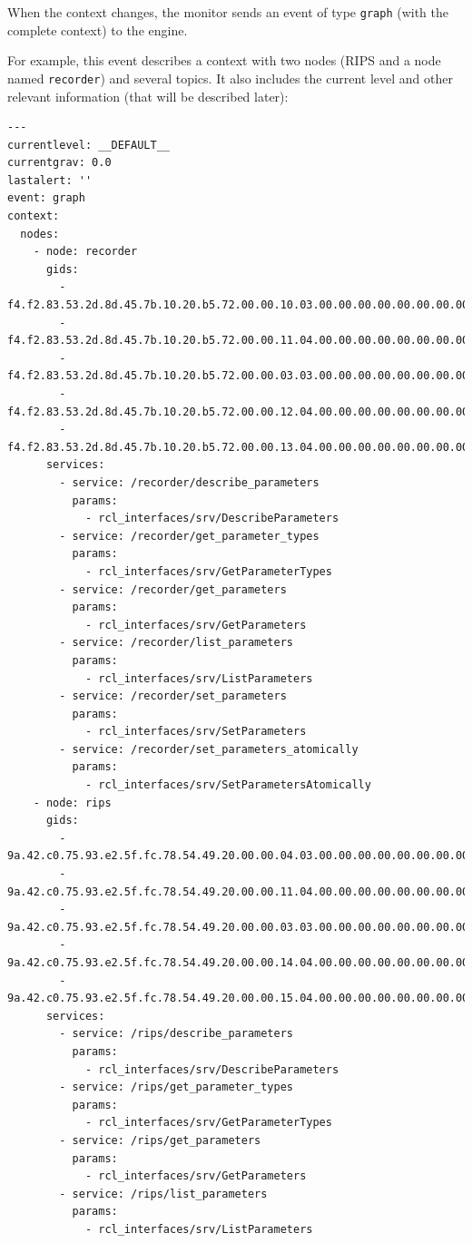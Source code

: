 \documentclass[a4paper]{article}
\begin{document}
When the context changes, the monitor sends an event of type \texttt{graph}
(with the complete context) to the engine.

For example, this event describes a context with two nodes (RIPS and
a node named \texttt{recorder}) and several topics.  It also includes
the current level and other relevant information (that will be described
later):

{\scriptsize
\begin{verbatim}
---
currentlevel: __DEFAULT__
currentgrav: 0.0
lastalert: ''
event: graph
context:
  nodes:
    - node: recorder
      gids:
        - f4.f2.83.53.2d.8d.45.7b.10.20.b5.72.00.00.10.03.00.00.00.00.00.00.00.00
        - f4.f2.83.53.2d.8d.45.7b.10.20.b5.72.00.00.11.04.00.00.00.00.00.00.00.00
        - f4.f2.83.53.2d.8d.45.7b.10.20.b5.72.00.00.03.03.00.00.00.00.00.00.00.00
        - f4.f2.83.53.2d.8d.45.7b.10.20.b5.72.00.00.12.04.00.00.00.00.00.00.00.00
        - f4.f2.83.53.2d.8d.45.7b.10.20.b5.72.00.00.13.04.00.00.00.00.00.00.00.00
      services:
        - service: /recorder/describe_parameters
          params:
            - rcl_interfaces/srv/DescribeParameters
        - service: /recorder/get_parameter_types
          params:
            - rcl_interfaces/srv/GetParameterTypes
        - service: /recorder/get_parameters
          params:
            - rcl_interfaces/srv/GetParameters
        - service: /recorder/list_parameters
          params:
            - rcl_interfaces/srv/ListParameters
        - service: /recorder/set_parameters
          params:
            - rcl_interfaces/srv/SetParameters
        - service: /recorder/set_parameters_atomically
          params:
            - rcl_interfaces/srv/SetParametersAtomically
    - node: rips
      gids:
        - 9a.42.c0.75.93.e2.5f.fc.78.54.49.20.00.00.04.03.00.00.00.00.00.00.00.00
        - 9a.42.c0.75.93.e2.5f.fc.78.54.49.20.00.00.11.04.00.00.00.00.00.00.00.00
        - 9a.42.c0.75.93.e2.5f.fc.78.54.49.20.00.00.03.03.00.00.00.00.00.00.00.00
        - 9a.42.c0.75.93.e2.5f.fc.78.54.49.20.00.00.14.04.00.00.00.00.00.00.00.00
        - 9a.42.c0.75.93.e2.5f.fc.78.54.49.20.00.00.15.04.00.00.00.00.00.00.00.00
      services:
        - service: /rips/describe_parameters
          params:
            - rcl_interfaces/srv/DescribeParameters
        - service: /rips/get_parameter_types
          params:
            - rcl_interfaces/srv/GetParameterTypes
        - service: /rips/get_parameters
          params:
            - rcl_interfaces/srv/GetParameters
        - service: /rips/list_parameters
          params:
            - rcl_interfaces/srv/ListParameters

\end{verbatim}}
\end{document}
